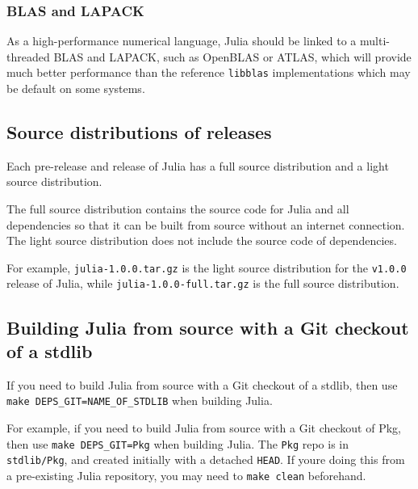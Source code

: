 \hypertarget{16914034871400552403}{}


\subsubsection{BLAS and LAPACK}



As a high-performance numerical language, Julia should be linked to a multi-threaded BLAS and LAPACK, such as OpenBLAS or ATLAS, which will provide much better performance than the reference \texttt{libblas} implementations which may be default on some systems.



\hypertarget{14353796440229471494}{}


\subsection{Source distributions of releases}



Each pre-release and release of Julia has a {\textquotedbl}full{\textquotedbl} source distribution and a {\textquotedbl}light{\textquotedbl} source distribution.



The full source distribution contains the source code for Julia and all dependencies so that it can be built from source without an internet connection. The light source distribution does not include the source code of dependencies.



For example, \texttt{julia-1.0.0.tar.gz} is the light source distribution for the \texttt{v1.0.0} release of Julia, while \texttt{julia-1.0.0-full.tar.gz} is the full source distribution.



\hypertarget{12404192935650271562}{}


\subsection{Building Julia from source with a Git checkout of a stdlib}



If you need to build Julia from source with a Git checkout of a stdlib, then use \texttt{make DEPS\_GIT=NAME\_OF\_STDLIB} when building Julia.



For example, if you need to build Julia from source with a Git checkout of Pkg, then use \texttt{make DEPS\_GIT=Pkg} when building Julia. The \texttt{Pkg} repo is in \texttt{stdlib/Pkg}, and created initially with a detached \texttt{HEAD}. If you{\textquotesingle}re doing this from a pre-existing Julia repository, you may need to \texttt{make clean} beforehand.




